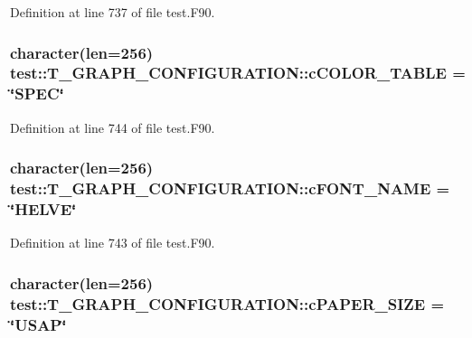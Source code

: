 Definition at line 737 of file test.F90.

\hypertarget{typetest_1_1_t___g_r_a_p_h___c_o_n_f_i_g_u_r_a_t_i_o_n_a65ebf1581c5437e0b6ff2245d50d94b1}{
\subsubsection[{cCOLOR\_\-TABLE}]{\setlength{\rightskip}{0pt plus 5cm}character(len=256) {\bf test::T\_\-GRAPH\_\-CONFIGURATION::cCOLOR\_\-TABLE} = \char`\"{}SPEC\char`\"{}}}
\label{typetest_1_1_t___g_r_a_p_h___c_o_n_f_i_g_u_r_a_t_i_o_n_a65ebf1581c5437e0b6ff2245d50d94b1}


Definition at line 744 of file test.F90.

\hypertarget{typetest_1_1_t___g_r_a_p_h___c_o_n_f_i_g_u_r_a_t_i_o_n_a46682f51ea3e65d3bf8c54ab2fecf2f7}{
\subsubsection[{cFONT\_\-NAME}]{\setlength{\rightskip}{0pt plus 5cm}character(len=256) {\bf test::T\_\-GRAPH\_\-CONFIGURATION::cFONT\_\-NAME} = \char`\"{}HELVE\char`\"{}}}
\label{typetest_1_1_t___g_r_a_p_h___c_o_n_f_i_g_u_r_a_t_i_o_n_a46682f51ea3e65d3bf8c54ab2fecf2f7}


Definition at line 743 of file test.F90.

\hypertarget{typetest_1_1_t___g_r_a_p_h___c_o_n_f_i_g_u_r_a_t_i_o_n_adbb5bf5964ed6673dcb8cc3527f06245}{
\subsubsection[{cPAPER\_\-SIZE}]{\setlength{\rightskip}{0pt plus 5cm}character(len=256) {\bf test::T\_\-GRAPH\_\-CONFIGURATION::cPAPER\_\-SIZE} = \char`\"{}USAP\char`\"{}}}
\label{typetest_1_1_t___g_r_a_p_h___c_o_n_f_i_g_u_r_a_t_i_o_n_adbb5bf5964ed6673dcb8cc3527f06245}



